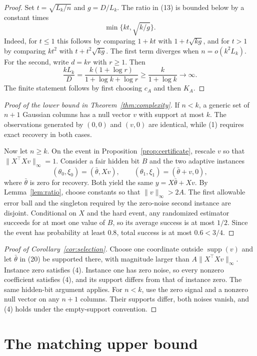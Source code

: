 \documentclass[twoside]{article}
\newcommand{\supp}{\operatorname{supp}}
\begin{document}
\begin{proof}
Set $t=\sqrt{L_k/n}$ and $g=D/L_k$. The ratio in (13) is bounded below by
a constant times
\[
 \min\{kt,\sqrt{k/g}\}.
 \tag{19}
\]
Indeed, for $t\leq1$ this follows by comparing $1+kt$ with
$1+t\sqrt{kg}$, and for $t>1$ by comparing $kt^2$ with
$t+t^2\sqrt{kg}$.
The first term diverges when $n=o(k^2L_k)$. For the second, write
$d=kr$ with $r\geq1$. Then
\[
 \frac{kL_k}{D}
 =\frac{k(1+\log r)}{1+\log k+\log r}
 \geq\frac{k}{1+\log k}\longrightarrow\infty.
\]
The finite statement follows by first choosing $c_A$ and then $K_A$.
\end{proof}

\begin{proof}[Proof of the lower bound in Theorem~\ref{thm:complexity}]
If $n<k$, a generic set of $n+1$ Gaussian columns has a null vector $v$ with
support at most $k$. The observations generated by $(0,0)$ and $(v,0)$ are
identical, while (1) requires exact recovery in both cases.

Now let $n\geq k$. On the event in Proposition~\ref{prop:certificate}, rescale
$v$ so that $\|X^\top Xv\|_\infty=1$. Consider a fair hidden bit $B$ and the
two adaptive instances
\[
 (\theta_0,\xi_0)=(\bar\theta,Xv),
 \qquad
 (\theta_1,\xi_1)=(\bar\theta+v,0),
 \tag{20}
\]
where $\bar\theta$ is zero for recovery. Both yield the same $y=X\bar\theta+Xv$.
By Lemma~\ref{lem:ratio}, choose constants so that $\|v\|_\infty>2A$.
The first allowable error ball and the singleton required by the zero-noise
second instance are disjoint. Conditional on $X$ and the hard event, any
randomized estimator succeeds for at most one value of $B$, so its average
success is at most $1/2$. Since the event has probability at least $0.8$, total
success is at most $0.6<3/4$.
\end{proof}

\begin{proof}[Proof of Corollary~\ref{cor:selection}]
Choose one coordinate outside $\supp(v)$ and let $\bar\theta$ in (20) be
supported there, with magnitude larger than $A\|X^\top Xv\|_\infty$.
Instance zero satisfies (4). Instance one has zero noise, so every nonzero
coefficient satisfies (4), and its support differs from that of instance zero.
The same hidden-bit argument applies. For $n<k$, use the zero signal and a
nonzero null vector on any $n+1$ columns. Their supports differ, both noises
vanish, and (4) holds under the empty-support convention.
\end{proof}

\section{The matching upper bound}
\label{sec:upper}
\end{document}
